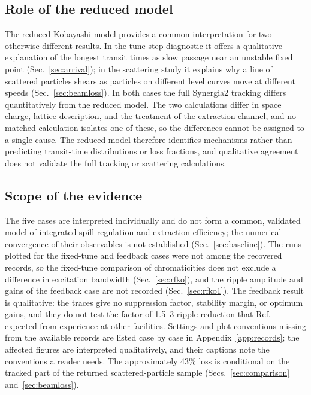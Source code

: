 \documentclass[a4paper,fleqn]{cas-sc}
\begin{document}
\subsection{\label{sec:modeldisc}Role of the reduced model}

The reduced Kobayashi model provides a common interpretation for two otherwise different results. In the tune-step diagnostic it offers a qualitative explanation of the longest transit times as slow passage near an unstable fixed point (Sec.~\ref{sec:arrival}); in the scattering study it explains why a line of scattered particles shears as particles on different level curves move at different speeds (Sec.~\ref{sec:beamloss}). In both cases the full Synergia2 tracking differs quantitatively from the reduced model. The two calculations differ in space charge, lattice description, and the treatment of the extraction channel, and no matched calculation isolates one of these, so the differences cannot be assigned to a single cause. The reduced model therefore identifies mechanisms rather than predicting transit-time distributions or loss fractions, and qualitative agreement does not validate the full tracking or scattering calculations.

\subsection{\label{sec:limits}Scope of the evidence}

The five cases are interpreted individually and do not form a common, validated model of integrated spill regulation and extraction efficiency; the numerical convergence of their observables is not established (Sec.~\ref{sec:baseline}). The runs plotted for the fixed-tune and feedback cases were not among the recovered records, so the fixed-tune comparison of chromaticities does not exclude a difference in excitation bandwidth (Sec.~\ref{sec:rfko}), and the ripple amplitude and gains of the feedback case are not recorded (Sec.~\ref{sec:rfko1}). The feedback result is qualitative: the traces give no suppression factor, stability margin, or optimum gains, and they do not test the factor of 1.5--3 ripple reduction that Ref.~\cite{mu2e} expected from experience at other facilities. Settings and plot conventions missing from the available records are listed case by case in Appendix~\ref{app:records}; the affected figures are interpreted qualitatively, and their captions note the conventions a reader needs. The approximately 43\% loss is conditional on the tracked part of the returned scattered-particle sample (Secs.~\ref{sec:comparison} and~\ref{sec:beamloss}).
\end{document}
